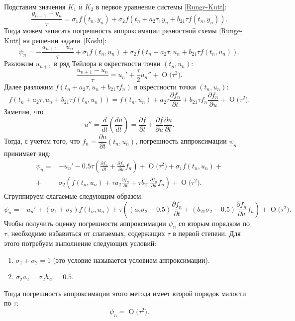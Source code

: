 \documentclass[11pt,a4paper,twoside,listtotoc,bibtotoc]{report}
\numberwithin{equation}{section}
\theoremstyle{definition}
\theoremstyle{plain}
\newcommand{\bigO}[1]{\ensuremath{\operatorname{O}\bigl(#1\bigr)}}
\begin{document}
Подставим значения $K_1$ и $K_2$ в первое уравнение системы \eqref{Runge-Kutt}:
%
$$
    \frac{y_{n+1} - y_n}{\tau} = \sigma_1 f(t_n, y_n) +
    \sigma_2 f(t_n + a_2 \tau, y_n + b_{21} \tau f(t_n, y_n)).
$$
%
Тогда можем записать погрешность аппроксимации разностной схемы \eqref{Runge-Kutt}
на решении задачи~\eqref{Koshi}:
%
\begin{equation}
%
    \label{Runge-Kutt_appr}
    \psi_n = - \frac{u_{n+1} - u_n}{\tau} + \sigma_1 f(t_n, u_n) +
    \sigma_2 f\left(t_n+a_2\tau, u_n + b_{21}\tau f(t_n, u_n)\right).
%
\end{equation}
%
Разложим $u_{n+1}$ в ряд Тейлора в окрестности точки $(t_n, u_n)$:
%
$$
    \frac{u_{n+1} - u_n}{\tau} = u_n' + \frac{\tau}2 u_n'' + \bigO{\tau^2}.
$$
%
Далее разложим $f(t_n + a_2\tau, u_n + b_{21} \tau f_n)$ в окрестности точки $(t_n, u_n)$:
%
$$
    f(t_n + a_2\tau, u_n + b_{21} \tau f(t_n, u_n)) = f(t_n, u_n) +
    a_2\tau \frac{\partial f_n}{\partial t} +
    b_{21}\tau f_n \frac{\partial f_n}{\partial u} + \bigO{\tau^2}.
$$
%
Заметим, что
%
$$
    u'' = \dfrac{d}{dt}\left(\frac{du}{dt}\right) =
    \dfrac{\partial f}{\partial t} + \dfrac{\partial f}{\partial u}\dfrac{\partial u}{\partial t}.
$$
%
Тогда, с учетом того, что $f_n = \dfrac{\partial u}{\partial t}(t_n, u_n)$,
погрешность аппроксимации $\psi_n$ принимает вид:
%
\begin{equation*}
%
    \begin{split}
    \psi_n =& -u_n' - 0.5\tau\left(\frac{\partial f_n}{\partial t} +
    \frac{\partial f_n}{\partial u}f_n\right) + \bigO{\tau^2} + \sigma_1 f(t_n, u_n) + \\
    +& \sigma_2 \left(f(t_n, u_n) + \tau a_2 \frac{\partial f_n}{\partial t} +
    \tau b_{21} \frac{\partial f_n}{\partial u}f_n\right) + \bigO{\tau^2}.
    \end{split}
%
\end{equation*}
%
Сгруппируем слагаемые следующим образом:
%
$$
    \psi_n = -u_n' +(\sigma_1 + \sigma_2)f(t_n, u_n) +
    \tau\left((a_2\sigma_2 - 0.5)\frac{\partial f_n}{\partial t} +
    (b_{21}\sigma_2 - 0.5)\frac{\partial f_n}{\partial u}f_n\right) + \bigO{\tau^2}.
$$
%
Чтобы получить оценку погрешности аппроксимации $\psi_n$ со вторым порядком по $\tau$,
необходимо избавиться от слагаемых, содержащих $\tau$ в первой степени.
Для этого потребуем выполнение следующих условий:
%
\begin{enumerate}
%
    \item
        $\sigma_1 + \sigma_2 = 1$ (это условие называется условием аппроксимации).
    \item
        $\sigma_2 a_2 = \sigma_2 b_{21} = 0.5$.
%
\end{enumerate}
%
Тогда погрешность аппроксимации этого метода имеет второй порядок малости по $\tau$:
%
$$
    \psi_n = \bigO{\tau^2}.
$$
\end{document}
